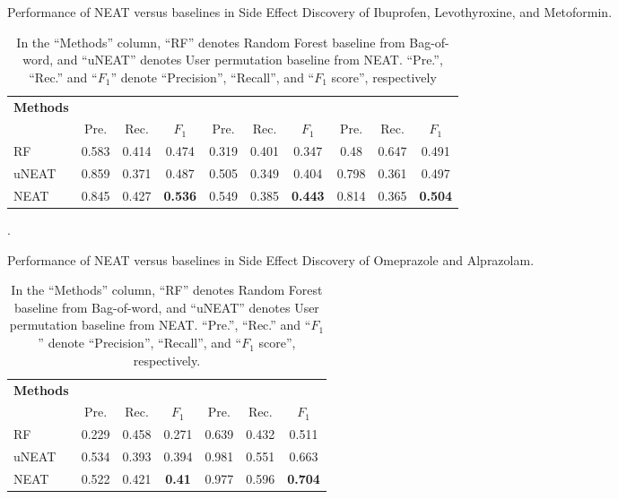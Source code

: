 \documentclass{bmcart}
\begin{document}
\begin{backmatter}
\begin{table}[h!]
  \label{table:credibility}
\end{table}
\begin{table}[h!]
  \caption{Performance of NEAT versus baselines in Side Effect Discovery of Ibuprofen, Levothyroxine, and Metoformin.}
  \scalebox{1.2}
  \footnotesize
  \begin{tabular}{l|c c c|c c c|c c c}
    \hline
    \textbf{Methods}& 
    \multicolumn{3}{c|}{\centering{Ibuprofen}} & \multicolumn{3}{c|}{\centering{Levothyroxine}} & \multicolumn{3}{c}{\centering{Metoformin}}\\
    & Pre. & Rec. & $F_1$ & Pre. & Rec. & $F_1$ & Pre. & Rec. & $F_1$ \\ \hline
    RF & 0.583 & 0.414 & 0.474 & 0.319 & 0.401 & 0.347 & 0.48 & 0.647 & 0.491 \\
    uNEAT & 0.859 & 0.371 & 0.487 & 0.505 & 0.349 & 0.404 & 0.798 & 0.361 & 0.497 \\
    NEAT & 0.845 & 0.427 & \textbf{0.536} & 0.549 & 0.385 & \textbf{0.443} & 0.814 & 0.365 & \textbf{0.504} \\ \hline
  \end{tabular}
  \caption*{In the ``Methods'' column, ``RF'' denotes Random Forest baseline from Bag-of-word, and ``uNEAT'' denotes User permutation baseline from NEAT. ``Pre.'', ``Rec.'' and ``$F_1$'' denote ``Precision'', ``Recall'', and ``$F_1$ score'', respectively}.
  \label{table:se_discovery1}
\end{table}
\begin{table}[h!]
  \caption{Performance of NEAT versus baselines in Side Effect Discovery of Omeprazole and Alprazolam.}
  \scalebox{1.2}
  \footnotesize
  \begin{tabular}{l|c c c|c c c}
    \hline
    \textbf{Methods} &
    \multicolumn{3}{c|}{\centering{Omeprazole}} &
    \multicolumn{3}{c}{\centering{Alprazolam}}\\
    & Pre. & Rec. & $F_1$ & Pre. & Rec. & $F_1$ \\ \hline
    RF & 0.229 & 0.458 & 0.271 & 0.639 & 0.432 & 0.511 \\
    uNEAT & 0.534 & 0.393 & 0.394 & 0.981 & 0.551 & 0.663 \\
    NEAT & 0.522 & 0.421 & \textbf{0.41} & 0.977 & 0.596 & \textbf{0.704} \\ \hline
  \end{tabular}
  \caption*{In the ``Methods'' column, ``RF'' denotes Random Forest baseline from Bag-of-word, and ``uNEAT'' denotes User permutation baseline from NEAT. ``Pre.'', ``Rec.'' and ``$F_1$'' denote ``Precision'', ``Recall'', and ``$F_1$ score'', respectively.}

\end{table}
\end{backmatter}
\end{document}
